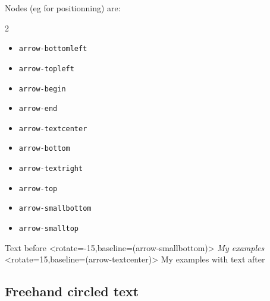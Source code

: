 \documentclass[11pt,a4paper]{ltxdoc}
\begin{document}
Nodes (eg for positionning) are:
%
\begin{multicols}{2}
	\begin{itemize}
		\item \texttt{arrow-bottomleft}
		\item \texttt{arrow-topleft}
		\item \texttt{arrow-begin}
		\item \texttt{arrow-end}
		\item \texttt{arrow-textcenter}
		\item \texttt{arrow-bottom}
		\item \texttt{arrow-textright}
		\item \texttt{arrow-top}
		\item \texttt{arrow-smallbottom}
		\item \texttt{arrow-smalltop}
	\end{itemize}
\end{multicols}

\begin{DemoCode}{}
\end{DemoCode}

\begin{DemoCode}{}
\end{DemoCode}

\begin{DemoCode}{}
\end{DemoCode}

\begin{DemoCode}{}
Text before
\tkzfittextinarrow%
  [bheight=1em,sheight=0.6em,width=3em,color=green!50!black]%
  <rotate=-15,baseline=(arrow-smallbottom)>%
  {\itshape My examples}
\tkzfittextinarrow%
  [bheight=1em,sheight=0.6em,width=3em,color=green!50!black,expand]%
  <rotate=15,baseline=(arrow-textcenter)>%
  {\ttfamily My examples}
with text after
\end{DemoCode}

\pagebreak

\subsection{Freehand circled text}
\end{document}
